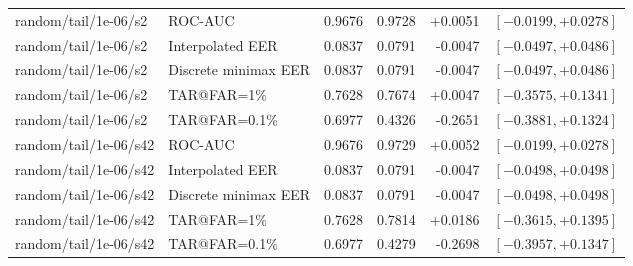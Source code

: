 \begin{table}[!t]
\begin{tabular}{@{}llrrrr@{}}
random/tail/1e-06/s2 & ROC-AUC & 0.9676 & 0.9728 & +0.0051 & $[-0.0199,+0.0278]$ \\
random/tail/1e-06/s2 & Interpolated EER & 0.0837 & 0.0791 & -0.0047 & $[-0.0497,+0.0486]$ \\
random/tail/1e-06/s2 & Discrete minimax EER & 0.0837 & 0.0791 & -0.0047 & $[-0.0497,+0.0486]$ \\
random/tail/1e-06/s2 & TAR@FAR=1\% & 0.7628 & 0.7674 & +0.0047 & $[-0.3575,+0.1341]$ \\
random/tail/1e-06/s2 & TAR@FAR=0.1\% & 0.6977 & 0.4326 & -0.2651 & $[-0.3881,+0.1324]$ \\
random/tail/1e-06/s42 & ROC-AUC & 0.9676 & 0.9729 & +0.0052 & $[-0.0199,+0.0278]$ \\
random/tail/1e-06/s42 & Interpolated EER & 0.0837 & 0.0791 & -0.0047 & $[-0.0498,+0.0498]$ \\
random/tail/1e-06/s42 & Discrete minimax EER & 0.0837 & 0.0791 & -0.0047 & $[-0.0498,+0.0498]$ \\
random/tail/1e-06/s42 & TAR@FAR=1\% & 0.7628 & 0.7814 & +0.0186 & $[-0.3615,+0.1395]$ \\
random/tail/1e-06/s42 & TAR@FAR=0.1\% & 0.6977 & 0.4279 & -0.2698 & $[-0.3957,+0.1347]$ \\
\bottomrule
\end{tabular}
\end{table}
